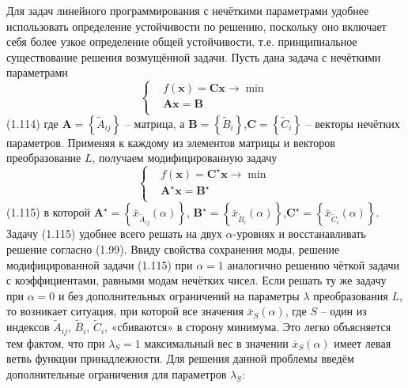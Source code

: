 Для задач линейного программирования с нечёткими параметрами удобнее использовать определение устойчивости по решению, поскольку оно включает себя более узкое определение общей устойчивости, т.е. принципиальное существование решения возмущённой задачи. Пусть дана задача с нечёткими параметрами
	\[\left\{ \begin{aligned}
  & f\left( \mathbf{x} \right)=\mathbf{Cx}\to \min  \\ 
 & \mathbf{Ax}=\mathbf{B} \\ 
\end{aligned} \right.\] 	(1.114)
где $\mathbf{A}=\left\{ {{{\tilde{A}}}_{ij}} \right\}$ – матрица, а $\mathbf{B}=\left\{ {{{\tilde{B}}}_{i}} \right\}$,$\mathbf{C}=\left\{ {{{\tilde{C}}}_{i}} \right\}$ – векторы нечётких параметров. Применяя к каждому из элементов матрицы и векторов преобразование $L$, получаем модифицированную задачу
	\[\left\{ \begin{aligned}
  & f\left( \mathbf{x} \right)={{\mathbf{C}}^{\star}}\mathbf{x}\to \min  \\ 
 & {{\mathbf{A}}^{\star}}\mathbf{x}={{\mathbf{B}}^{\star}} \\ 
\end{aligned} \right.\] 	(1.115)
в которой ${{\mathbf{A}}^{\star}}=\left\{ {{{\bar{x}}}_{{{{\tilde{A}}}_{ij}}}}\left( \alpha  \right) \right\}$, ${{\mathbf{B}}^{\star}}=\left\{ {{{\bar{x}}}_{{{{\tilde{B}}}_{i}}}}\left( \alpha  \right) \right\}$,${{\mathbf{C}}^{\star}}=\left\{ {{{\bar{x}}}_{{{{\tilde{C}}}_{i}}}}\left( \alpha  \right) \right\}$.
Задачу (1.115) удобнее всего решать на двух $\alpha$-уровнях и восстанавливать решение согласно (1.99). Ввиду свойства сохранения моды, решение модифицированной задачи (1.115) при $\alpha=1$ аналогично решению чёткой задачи с коэффициентами, равными модам нечётких чисел. Если решать ту же задачу при $\alpha =0$ и без дополнительных ограничений на параметры $\lambda$ преобразования $L$, то возникает ситуация, при которой все значения ${{\bar{x}}_{S}}\left( \alpha  \right)$, где $S$ – один из индексов $\tilde A_{ij}$, $\tilde B_i$, $\tilde C_i$, «сбиваются» в сторону минимума. Это легко объясняется тем фактом, что при ${{\lambda }_{S}}=1$ максимальный вес в значении ${{\bar{x}}_{S}}\left( \alpha  \right)$ имеет левая ветвь функции принадлежности. Для решения данной проблемы введём дополнительные ограничения для параметров ${{\lambda }_{S}}$:
